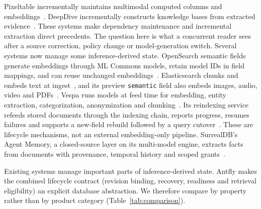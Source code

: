 \documentclass[sigconf,nonacm]{acmart}
\begin{document}
Pixeltable incrementally maintains multimodal computed columns and embeddings~\cite{pixeltable}.
DeepDive incrementally constructs knowledge bases from extracted evidence~\cite{deepdive}.
These systems make dependency maintenance and incremental extraction direct
precedents. The question here is what a concurrent reader sees after a
source correction, policy change or model-generation switch.
Several systems now manage some inference-derived state. OpenSearch semantic
fields generate embeddings through ML Commons models, retain model IDs in
field mappings, and can reuse unchanged embeddings~\cite{opensearch-semantic,opensearch-connectors}.
Elasticsearch chunks and embeds text at ingest~\cite{elastic-semantic-text},
and its preview \texttt{semantic} field also embeds images, audio, video and
PDFs~\cite{elastic-semantic}. Vespa runs models at feed time for embedding,
entity extraction, categorization, anonymization and
chunking~\cite{vespa-enrichment}. Its reindexing service refeeds stored
documents through the indexing chain, reports progress, resumes failures and
supports a new-field rebuild followed by a query cutover~\cite{vespa-reindexing}.
These are lifecycle mechanisms, not an external embedding-only pipeline. SurrealDB's Agent Memory, a closed-source
layer on its multi-model engine, extracts facts from documents with
provenance, temporal history and scoped grants~\cite{surrealdb-agent-memory}.

Existing systems manage important parts of inference-derived state. Antfly
makes the combined lifecycle contract (revision binding, recovery,
readiness and retrieval eligibility) an explicit database abstraction. We
therefore compare by property rather than by product category
(Table~\ref{tab:comparison}).
\end{document}
